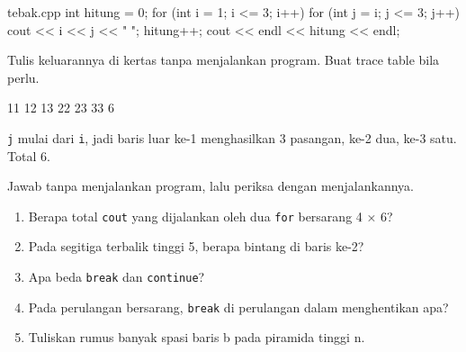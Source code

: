 \documentclass[a4paper]{article}
\begin{document}
\begin{MKode}{tebak.cpp}
int hitung = 0;
for (int i = 1; i <= 3; i++) {
    for (int j = i; j <= 3; j++) {
        cout << i << j << " ";
        hitung++;
    }
}
cout << endl << hitung << endl;
\end{MKode}
\begin{Tebak}[]
Tulis keluarannya di kertas tanpa menjalankan program. Buat trace table bila perlu.
\end{Tebak}
\begin{Jawaban}[]
\begin{MKeluaran}[]
11 12 13 22 23 33 
6
\end{MKeluaran}
\texttt{j} mulai dari \texttt{i}, jadi baris luar ke-1 menghasilkan 3 pasangan, ke-2 dua, ke-3 satu. Total 6.
\end{Jawaban}
\par\vspace{4pt}\par\vspace{6pt}
Jawab tanpa menjalankan program, lalu periksa dengan menjalankannya.
\begin{enumerate}
\item Berapa total \texttt{cout} yang dijalankan oleh dua \texttt{for} bersarang 4 × 6?
\item Pada segitiga terbalik tinggi 5, berapa bintang di baris ke-2?
\item Apa beda \texttt{break} dan \texttt{continue}?
\item Pada perulangan bersarang, \texttt{break} di perulangan dalam menghentikan apa?
\item Tuliskan rumus banyak spasi baris b pada piramida tinggi n.
\end{enumerate}
\end{document}
